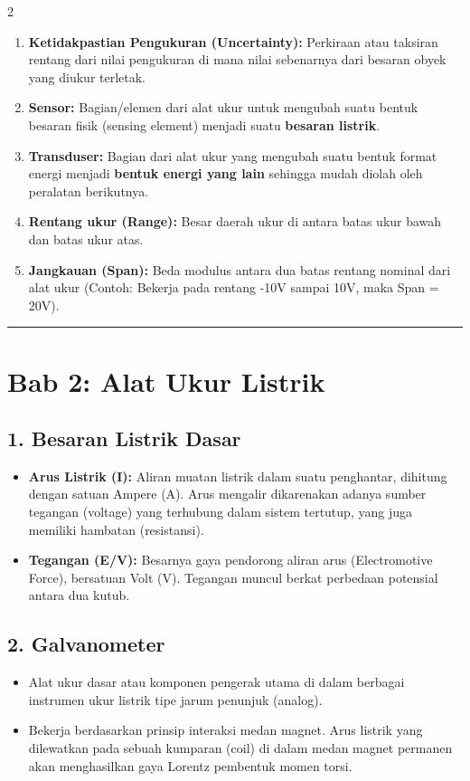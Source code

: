 \documentclass[10pt]{article}
\begin{document}
\begin{multicols}{2}
\begin{enumerate}
    \item \textbf{Ketidakpastian Pengukuran (Uncertainty):} Perkiraan atau taksiran rentang dari nilai pengukuran di mana nilai sebenarnya dari besaran obyek yang diukur terletak.
    \item \textbf{Sensor:} Bagian/elemen dari alat ukur untuk mengubah suatu bentuk besaran fisik (sensing element) menjadi suatu \textbf{besaran listrik}.
    \item \textbf{Transduser:} Bagian dari alat ukur yang mengubah suatu bentuk format energi menjadi \textbf{bentuk energi yang lain} sehingga mudah diolah oleh peralatan berikutnya.
    \item \textbf{Rentang ukur (Range):} Besar daerah ukur di antara batas ukur bawah dan batas ukur atas.
    \item \textbf{Jangkauan (Span):} Beda modulus antara dua batas rentang nominal dari alat ukur (Contoh: Bekerja pada rentang -10V sampai 10V, maka Span = 20V).
\end{enumerate}

\noindent\rule{\columnwidth}{0.4pt}

\section*{Bab 2: Alat Ukur Listrik}
\label{bab2}

\subsection*{1. Besaran Listrik Dasar}
\begin{itemize}
    \item \textbf{Arus Listrik (I):} Aliran muatan listrik dalam suatu penghantar, dihitung dengan satuan Ampere (A). Arus mengalir dikarenakan adanya sumber tegangan (voltage) yang terhubung dalam sistem tertutup, yang juga memiliki hambatan (resistansi).
    \item \textbf{Tegangan (E/V):} Besarnya gaya pendorong aliran arus (Electromotive Force), bersatuan Volt (V). Tegangan muncul berkat perbedaan potensial antara dua kutub.
\end{itemize}

\subsection*{2. Galvanometer}
\begin{itemize}
    \item Alat ukur dasar atau komponen pengerak utama di dalam berbagai instrumen ukur listrik tipe jarum penunjuk (analog).
    \item Bekerja berdasarkan prinsip interaksi medan magnet. Arus listrik yang dilewatkan pada sebuah kumparan (coil) di dalam medan magnet permanen akan menghasilkan gaya Lorentz pembentuk momen torsi. 
\end{itemize}


\end{multicols}
\end{document}

